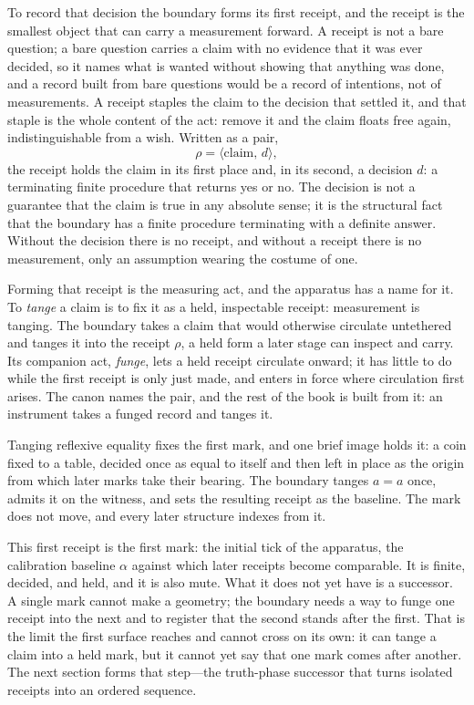 To record that decision the boundary forms its first receipt, and the receipt is the smallest object that can carry a measurement forward. A receipt is not a bare question; a bare question carries a claim with no evidence that it was ever decided, so it names what is wanted without showing that anything was done, and a record built from bare questions would be a record of intentions, not of measurements. A receipt staples the claim to the decision that settled it, and that staple is the whole content of the act: remove it and the claim floats free again, indistinguishable from a wish. Written as a pair,
\[
  \rho = \langle \text{claim},\, d \rangle,
\]
the receipt holds the claim in its first place and, in its second, a decision $d$: a terminating finite procedure that returns yes or no. The decision is not a guarantee that the claim is true in any absolute sense; it is the structural fact that the boundary has a finite procedure terminating with a definite answer. Without the decision there is no receipt, and without a receipt there is no measurement, only an assumption wearing the costume of one.

Forming that receipt is the measuring act, and the apparatus has a name for it. To \emph{tange} a claim is to fix it as a held, inspectable receipt: measurement is tanging. The boundary takes a claim that would otherwise circulate untethered and tanges it into the receipt $\rho$, a held form a later stage can inspect and carry. Its companion act, \emph{funge}, lets a held receipt circulate onward; it has little to do while the first receipt is only just made, and enters in force where circulation first arises. The canon names the pair, and the rest of the book is built from it: an instrument takes a funged record and tanges it.

Tanging reflexive equality fixes the first mark, and one brief image holds it: a coin fixed to a table, decided once as equal to itself and then left in place as the origin from which later marks take their bearing. The boundary tanges $a = a$ once, admits it on the witness, and sets the resulting receipt as the baseline. The mark does not move, and every later structure indexes from it.

This first receipt is the first mark: the initial tick of the apparatus, the calibration baseline $\alpha$ against which later receipts become comparable. It is finite, decided, and held, and it is also mute. What it does not yet have is a successor. A single mark cannot make a geometry; the boundary needs a way to funge one receipt into the next and to register that the second stands after the first. That is the limit the first surface reaches and cannot cross on its own: it can tange a claim into a held mark, but it cannot yet say that one mark comes after another. The next section forms that step---the truth-phase successor that turns isolated receipts into an ordered sequence.


